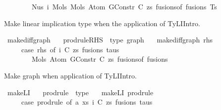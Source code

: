 \begin{isabellebody}
\ \ \ \ \ \ \ \ Nus{}\ i\ {\isacharparenleft}{\kern0pt}Mols{}\ {\isacharparenleft}{\kern0pt}Mols{}\ {\isacharparenleft}{\kern0pt}Atom\ {\isacharparenleft}{\kern0pt}GConstr\ C{\isacharparenright}{\kern0pt}\ zs{\isacharparenright}{\kern0pt}\ {\isacharparenleft}{\kern0pt}fusions{\isacharunderscore}{\kern0pt}of\ fusions{\isacharparenright}{\kern0pt}{\isacharparenright}{\kern0pt}\ Ts{\isacharparenright}{\kern0pt}{\isacharparenright}{\kern0pt}{\isachardoublequoteclose}%
\begin{isamarkuptext}%
Make linear implication type when the application of TyLIIntro.%
\end{isamarkuptext}\isamarkuptrue%
\isamarkupfalse%
\ make{\isacharunderscore}{\kern0pt}diffgraph\ {\isacharcolon}{\kern0pt}{\isacharcolon}{\kern0pt}\isanewline
\ \ {\isachardoublequoteopen}prodrule{\isacharunderscore}{\kern0pt}RHS\ {\isacharequal}{\kern0pt}{\isachargreater}{\kern0pt}\ type\ graph{\isachardoublequoteclose}\ \isanewline
\ \ {\isachardoublequoteopen}make{\isacharunderscore}{\kern0pt}diffgraph\ rhs\ {\isacharequal}{\kern0pt}\isanewline
\ \ \ \ \ {\isacharparenleft}{\kern0pt}case\ rhs\ of\ {\isacharparenleft}{\kern0pt}i{\isacharcomma}{\kern0pt}\ {\isacharparenleft}{\kern0pt}C{\isacharcomma}{\kern0pt}\ zs{\isacharparenright}{\kern0pt}{\isacharcomma}{\kern0pt}\ fusions{\isacharcomma}{\kern0pt}\ taus{\isacharparenright}{\kern0pt}\ {\isacharequal}{\kern0pt}{\isachargreater}{\kern0pt}\isanewline
\ \ \ \ \ \ \ \ Mols{}\ {\isacharparenleft}{\kern0pt}Atom\ {\isacharparenleft}{\kern0pt}GConstr\ C{\isacharparenright}{\kern0pt}\ zs{\isacharparenright}{\kern0pt}\ {\isacharparenleft}{\kern0pt}fusions{\isacharunderscore}{\kern0pt}of\ fusions{\isacharparenright}{\kern0pt}{\isacharparenright}{\kern0pt}{\isachardoublequoteclose}%
\begin{isamarkuptext}%
Make graph when application of TyLIIntro.%
\end{isamarkuptext}\isamarkuptrue%
\isamarkupfalse%
\ make{\isacharunderscore}{\kern0pt}LI\ {\isacharcolon}{\kern0pt}{\isacharcolon}{\kern0pt}\isanewline
\ \ {\isachardoublequoteopen}prodrule\ {\isacharequal}{\kern0pt}{\isachargreater}{\kern0pt}\ type{\isachardoublequoteclose}\ \isanewline
\ \ {\isachardoublequoteopen}make{\isacharunderscore}{\kern0pt}LI\ prodrule\ {\isacharequal}{\kern0pt}\isanewline
\ \ \ \ \ {\isacharparenleft}{\kern0pt}case\ prodrule\ of\ {\isacharparenleft}{\kern0pt}{\isacharparenleft}{\kern0pt}a{\isacharcomma}{\kern0pt}\ xs{\isacharparenright}{\kern0pt}{\isacharcomma}{\kern0pt}\ {\isacharparenleft}{\kern0pt}i{\isacharcomma}{\kern0pt}\ {\isacharparenleft}{\kern0pt}C{\isacharcomma}{\kern0pt}\ zs{\isacharparenright}{\kern0pt}{\isacharcomma}{\kern0pt}\ fusions{\isacharcomma}{\kern0pt}\ taus{\isacharparenright}{\kern0pt}{\isacharparenright}{\kern0pt}\ {\isacharequal}{\kern0pt}{\isachargreater}{\kern0pt}\isanewline

\end{isabellebody}
